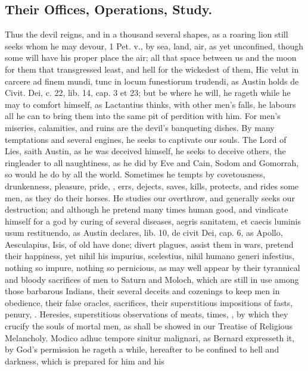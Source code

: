 {\subsection{Their Offices, Operations, Study.}
Thus the devil reigns, and in a
thousand several shapes, as a roaring lion still seeks whom he may
devour, 1 Pet. v., by sea, land, air, as yet unconfined, though 
some will have his proper place the air; all that space between us and
the moon for them that transgressed least, and hell for the wickedest
of them, Hic velut in carcere ad finem mundi, tunc in locum funestiorum
trudendi, as Austin holds de Civit. Dei, c. 22, lib. 14, cap. 3 et 23;
but be where he will, he rageth while he may to comfort himself, as
 Lactantius thinks, with other men's falls, he labours all he can
to bring them into the same pit of perdition with him. For men's
miseries, calamities, and ruins are the devil's banqueting dishes. By
many temptations and several engines, he seeks to captivate our souls.
The Lord of Lies, saith Austin, as he was deceived himself, he
seeks to deceive others, the ringleader to all naughtiness, as he did
by Eve and Cain, Sodom and Gomorrah, so would he do by all the world.
Sometimes he tempts by covetousness, drunkenness, pleasure, pride, \etc{},
errs, dejects, saves, kills, protects, and rides some men, as they do
their horses. He studies our overthrow, and generally seeks our
destruction; and although he pretend many times human good, and
vindicate himself for a god by curing of several diseases, aegris
sanitatem, et caecis luminis usum restituendo, as Austin declares, lib.
10, de civit Dei, cap. 6, as Apollo, Aesculapius, Isis, of old have
done; divert plagues, assist them in wars, pretend their happiness, yet
nihil his impurius, scelestius, nihil humano generi infestius, nothing
so impure, nothing so pernicious, as may well appear by their
tyrannical and bloody sacrifices of men to Saturn and Moloch, which are
still in use among those barbarous Indians, their several deceits and
cozenings to keep men in obedience, their false oracles, sacrifices,
their superstitious impositions of fasts, penury, \etc{}. Heresies,
superstitious observations of meats, times, \etc{}, by which they 
crucify the souls of mortal men, as shall be showed in our Treatise of
Religious Melancholy. Modico adhuc tempore sinitur malignari, as 
Bernard expresseth it, by God's permission he rageth a while, hereafter
to be confined to hell and darkness, which is prepared for him and his
}
